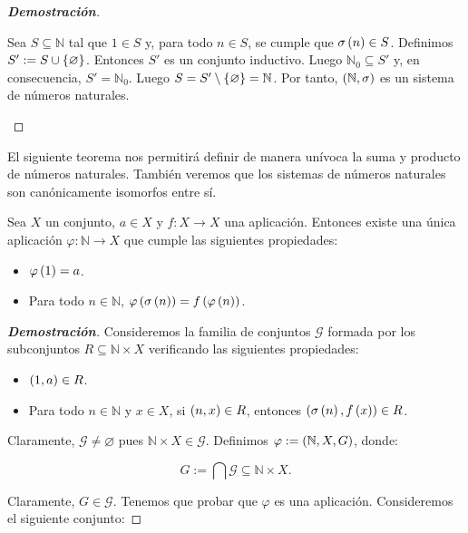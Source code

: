\begin{proposition}
\begin{proof}[\rm\textbf{Demostración}]
\begin{itemize}
      Sea $S\subseteq\mathbb{N}$ tal que $1\in S$ y, para todo $n\in S$, se cumple que $\sigma\left(n\right)\in S$. Definimos $S':=S\cup\left\{\varnothing\right\}$. Entonces $S'$ es un conjunto inductivo. Luego $\mathbb{N}_0\subseteq S'$ y, en consecuencia, $S'=\mathbb{N}_0$. Luego $S=S'\setminus\left\{\varnothing\right\}=\mathbb{N}$. Por tanto, $\left(\mathbb{N},\sigma\right)$ es un sistema de números naturales.
    \end{itemize}
  \end{proof}
\end{proposition}

El siguiente teorema nos permitirá definir de manera unívoca la suma y producto de números naturales. También veremos que los sistemas de números naturales son canónicamente isomorfos entre sí.

\begin{theorem}
  \rm Sea $X$ un conjunto, $a\in X$ y $f:X\rightarrow X$ una aplicación. Entonces existe una única aplicación $\varphi:\mathbb{N}\rightarrow X$ que cumple las siguientes propiedades:
  
  \begin{itemize}
    \item $\varphi\left(1\right)=a$.
    \item Para todo $n\in\mathbb{N}$, $\varphi\left(\sigma\left(n\right)\right)=f\left(\varphi\left(n\right)\right)$.
  \end{itemize}

  \begin{proof}[\rm\textbf{Demostración}]
    Consideremos la familia de conjuntos $\mathcal{G}$ formada por los subconjuntos $R\subseteq\mathbb{N}\times X$ verificando las siguientes propiedades:

    \begin{itemize}
      \item[1.] $\left(1,a\right)\in R$.
      \item[2.] Para todo $n\in\mathbb{N}$ y $x\in X$, si $\left(n,x\right)\in R$, entonces $\left(\sigma\left(n\right),f\left(x\right)\right)\in R$.
    \end{itemize}

    Claramente, $\mathcal{G}\neq\varnothing$ pues $\mathbb{N}\times X\in\mathcal{G}$. Definimos $\varphi:=\left(\mathbb{N},X,G\right)$, donde:

    \begin{equation}
      G:=\bigcap{\mathcal{G}}\subseteq\mathbb{N}\times X.
    \end{equation}

    Claramente, $G\in\mathcal{G}$. Tenemos que probar que $\varphi$ es una aplicación. Consideremos el siguiente conjunto:
    

\end{proof}
\end{theorem}
